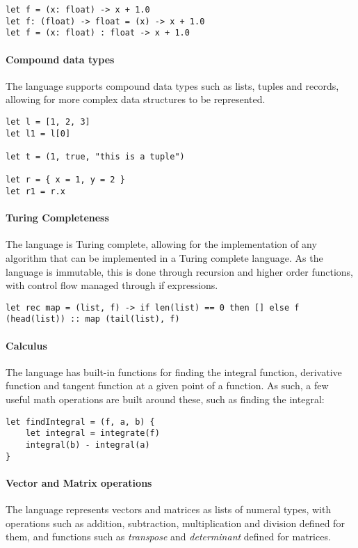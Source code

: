 \begin{verbatim}
let f = (x: float) -> x + 1.0
let f: (float) -> float = (x) -> x + 1.0
let f = (x: float) : float -> x + 1.0
\end{verbatim}

\paragraph{Compound data types} The language supports compound data types such as lists, tuples and records,
allowing for more complex data structures to be represented.

\begin{verbatim}
let l = [1, 2, 3]
let l1 = l[0]

let t = (1, true, "this is a tuple")

let r = { x = 1, y = 2 }
let r1 = r.x
\end{verbatim}

\paragraph{Turing Completeness} The language is Turing complete, allowing for the implementation of any
algorithm that can be implemented in a Turing complete language.
As the language is immutable, this is done through recursion and higher order functions, with control flow
managed through if expressions.

\begin{verbatim}
let rec map = (list, f) -> if len(list) == 0 then [] else f (head(list)) :: map (tail(list), f)
\end{verbatim}

\paragraph{Calculus} The language has built-in functions for finding the integral function, derivative function
and tangent function at a given point of a function.
As such, a few useful math operations are built around these, such as finding the integral:

\begin{verbatim}
let findIntegral = (f, a, b) {
    let integral = integrate(f)
    integral(b) - integral(a)
}
\end{verbatim}

\paragraph{Vector and Matrix operations} The language represents vectors and matrices as lists of numeral types, with
operations such as addition, subtraction, multiplication and division defined for them, and functions such as \textit{transpose} and \textit{determinant} defined for matrices.

